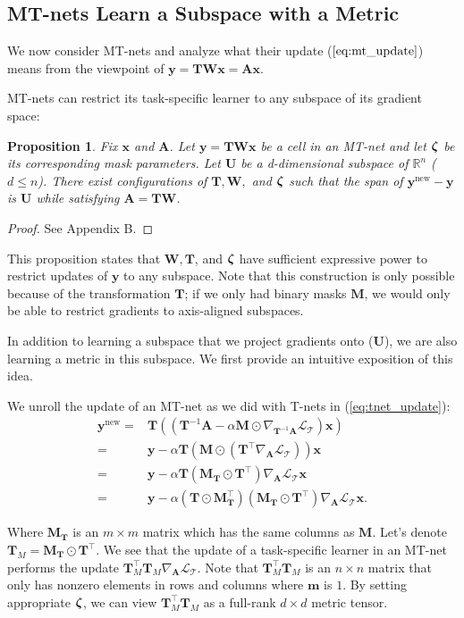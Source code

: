 \documentclass{article}
\newtheorem{prop}{Proposition}
\newcommand{\calT}{{\mathcal{T}}}
\newcommand{\bzeta}{\mbox{\boldmath $\zeta$}}
\newcommand{\0}{{\bf 0}}
\newcommand{\x}{\mathbf{x}}
\newcommand{\y}{\mathbf{y}}
\newcommand{\A}{\mathbf{A}}
\newcommand{\W}{\mathbf{W}}
\newcommand{\T}{\mathbf{T}}
\newcommand{\M}{\mathbf{M}}
\newcommand{\logit}{\bzeta}
\newcommand{\m}{\mathbf{m}}
\newcommand{\loss}{\mathcal{L}_{\calT}}
\newcommand{\U}{\mathbf{U}}
\newcommand{\mask}{\M}
\newcommand{\maskT}{\mask_{\T}}
\newcommand{\Rn}{\mathbb{R}^n}
\begin{document}
\subsection{MT-nets Learn a Subspace with a Metric}
\label{subsec:mtnet_analysis}
We now consider MT-nets and analyze what their update ($\ref{eq:mt_update}$) means from the viewpoint of $\y = \T \W \x = \A \x$.

MT-nets can restrict its task-specific learner to any subspace of its gradient space:

\begin{prop}
\label{prop}
Fix $\x$ and $\A$. 
Let $\y = \T \W \x$ be a cell in an MT-net and let $\logit$ be its corresponding mask parameters.
Let $\U$ be a d-dimensional subspace of $\Rn$ ($d \leq n$).
There exist configurations of $\T, \W,$ and $\logit$ such that the span of $\y^\text{new}-\y$ is $\U$ while satisfying $\A = \T \W$.
\end{prop}

\begin{proof}
See Appendix B.
\end{proof}

This proposition states that $\W, \T$, and $\logit$ have sufficient expressive power to restrict updates of $\y$ to any subspace.
Note that this construction is only possible because of the transformation $\T$; if we only had binary masks $\mask$, we would only be able to restrict gradients to axis-aligned subspaces.

In addition to learning a subspace that we project gradients onto ($\U$), we are also learning a metric in this subspace.
We first provide an intuitive exposition of this idea.

We unroll the update of an MT-net as we did with T-nets in (\ref{eq:tnet_update}):
\begin{align}
\y^\text{new} =& \T ((\T^{-1} \A - \alpha \mask \odot \nabla_{\T^{-1} \A} \loss) \x) \nonumber \\
=& \y - \alpha \T (\mask \odot (\T^{\top} \nabla_{\A} \loss)) \x \nonumber \\
=& \y - \alpha \T (\maskT \odot \T^{\top}) \nabla_{\A} \loss \x \nonumber \\
=& \y - \alpha (\T \odot \maskT^{\top}) (\maskT \odot \T^{\top}) \nabla_{\A} \loss \x.
\label{sumnet_metric}
\end{align}

Where $\maskT$ is an $m \times m$ matrix which has the same columns as $\mask$.
Let's denote $\T_M=\maskT \odot \T^{\top}$.
We see that the update of a task-specific learner in an MT-net performs the update $\T_M^\top \T_M \nabla_{\A} \loss$.
Note that $\T_M^\top \T_M$ is an $n \times n$ matrix that only has nonzero elements in rows and columns where $\m$ is $1$.
By setting appropriate $\logit$, we can view $\T_M^\top \T_M$ as a full-rank $d \times d$ metric tensor.
\end{document}

